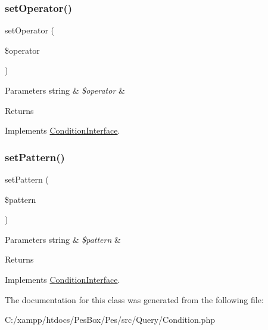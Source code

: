 \mbox{\label{class_pes_1_1_query_1_1_condition_af7996c125b44ce3a42130ccc56edf9f4}} 
\subsubsection{\texorpdfstring{set\+Operator()}{setOperator()}}
{\footnotesize\ttfamily set\+Operator (\begin{DoxyParamCaption}\item[{}]{\$operator }\end{DoxyParamCaption})}


\begin{DoxyParams}[1]{Parameters}
string & {\em \$operator} & \\
\hline
\end{DoxyParams}
\begin{DoxyReturn}{Returns}

\end{DoxyReturn}


Implements \mbox{\hyperlink{interface_pes_1_1_query_1_1_condition_interface_af7996c125b44ce3a42130ccc56edf9f4}{Condition\+Interface}}.

\mbox{\label{class_pes_1_1_query_1_1_condition_a36b6c101a93edd2abc86e7fc4507b5fa}} 
\subsubsection{\texorpdfstring{set\+Pattern()}{setPattern()}}
{\footnotesize\ttfamily set\+Pattern (\begin{DoxyParamCaption}\item[{}]{\$pattern }\end{DoxyParamCaption})}


\begin{DoxyParams}[1]{Parameters}
string & {\em \$pattern} & \\
\hline
\end{DoxyParams}
\begin{DoxyReturn}{Returns}

\end{DoxyReturn}


Implements \mbox{\hyperlink{interface_pes_1_1_query_1_1_condition_interface_a36b6c101a93edd2abc86e7fc4507b5fa}{Condition\+Interface}}.



The documentation for this class was generated from the following file\+:\begin{DoxyCompactItemize}
\item 
C\+:/xampp/htdocs/\+Pes\+Box/\+Pes/src/\+Query/Condition.\+php\end{DoxyCompactItemize}
